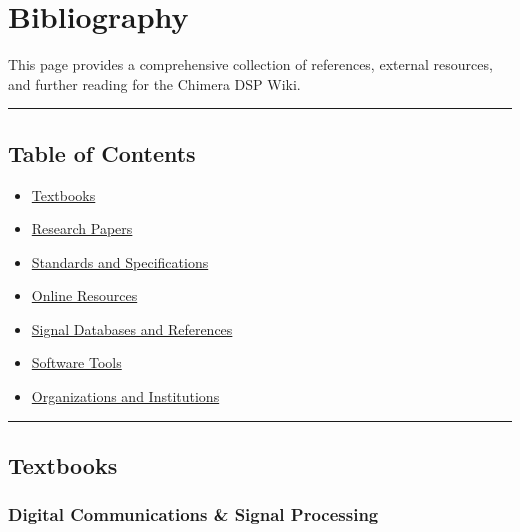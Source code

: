 \section{Bibliography}\label{bibliography}

This page provides a comprehensive collection of references, external
resources, and further reading for the Chimera DSP Wiki.

\begin{center}\rule{0.5\linewidth}{0.5pt}\end{center}

\subsection{\texorpdfstring{Table of Contents}{Table of Contents}}\label{table-of-contents}

\begin{itemize}
\tightlist
\item
  \hyperref[textbooks]{Textbooks}
\item
  \hyperref[research-papers]{Research Papers}
\item
  \hyperref[standards-and-specifications]{Standards and Specifications}
\item
  \hyperref[online-resources]{Online Resources}
\item
  \hyperref[signal-databases-and-references]{Signal Databases and
  References}
\item
  \hyperref[software-tools]{Software Tools}
\item
  \hyperref[organizations-and-institutions]{Organizations and
  Institutions}
\end{itemize}

\begin{center}\rule{0.5\linewidth}{0.5pt}\end{center}

\subsection{\texorpdfstring{Textbooks}{Textbooks}}\label{textbooks}

\subsubsection{Digital Communications \& Signal
Processing}\label{digital-communications-signal-processing}

